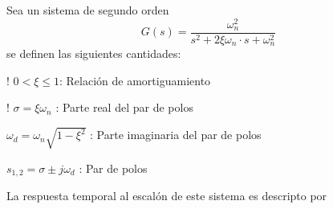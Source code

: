 \begin{definition}
    Sea un sistema de segundo orden
    \begin{equation*}
        G (s) = \dfrac{\omega_n^2}{s^2 + 2 \xi \omega_n \cdot s + \omega_n ^2}
    \end{equation*}
    se definen las siguientes cantidades:
\end{definition}
\begin{bangenumerate}
    \item! \; \; $0 < \textbf{$\xi$} \leq 1 $: Relación de amortiguamiento
    \item! \; \; $\sigma = \xi \omega_n$ : Parte real del par de polos
    \item \; \; $\omega_d = \omega_n \sqrt{1- \xi ^2}$ : Parte imaginaria del par de polos
    \item \; \; $s_{1,2} = \sigma \pm j \omega_d$ : Par de polos 
\end{bangenumerate}

\vspace*{5pt}
La respuesta temporal al escalón de este sistema es descripto por

